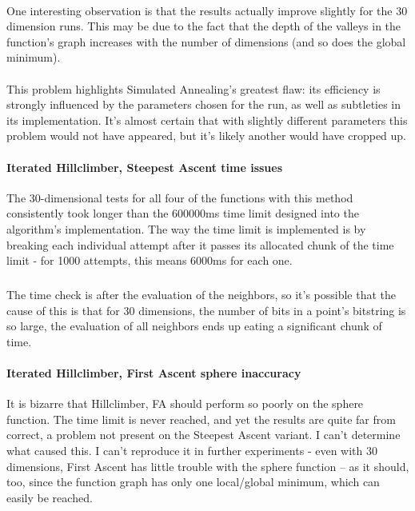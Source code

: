 \documentclass{article}
\begin{document}
    \paragraph{}
    One interesting observation is that the results actually improve slightly for the 30 dimension runs. This may be due to the fact that the depth of the valleys in the function's graph increases with the number of dimensions (and so does the global minimum).
    \paragraph{}
    This problem highlights Simulated Annealing's greatest flaw: its efficiency is strongly influenced by the parameters chosen for the run, as well as subtleties in its implementation. It's almost certain that with slightly different parameters this problem would not have appeared, but it's likely another would have cropped up.

    \paragraph{Iterated Hillclimber, Steepest Ascent time issues}
    The 30-dimensional tests for all four of the functions with this method consistently took longer than the 600000ms time limit designed into the algorithm's implementation. The way the time limit is implemented is by breaking each individual attempt after it passes its allocated chunk of the time limit - for 1000 attempts, this means 6000ms for each one. 
    \subparagraph{}
    The time check is after the evaluation of the neighbors, so it's possible that the cause of this is that for 30 dimensions, the number of bits in a point's bitstring is so large, the evaluation of all neighbors ends up eating a significant chunk of time.

    \paragraph{Iterated Hillclimber, First Ascent sphere inaccuracy}
    It is bizarre that Hillclimber, FA should perform so poorly on the sphere function. The time limit is never reached, and yet the results are quite far from correct, a problem not present on the Steepest Ascent variant. I can't determine what caused this. I can't reproduce it in further experiments - even with 30 dimensions, First Ascent has little trouble with the sphere function -- as it should, too, since the function graph has only one local/global minimum, which can easily be reached.
\end{document}
